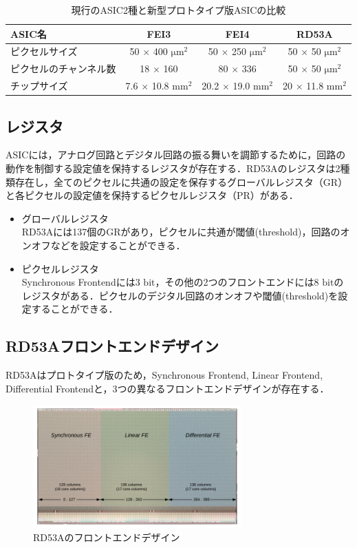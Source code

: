 \begin{table}[h]
  \centering
  \caption{現行のASIC2種と新型プロトタイプ版ASICの比較}
  \begin{tabular} {|l|cc|c|} \hline
    ASIC名 & FEI3 & FEI4 & RD53A \\ \hline \hline
    ピクセルサイズ & 50 $\times$ 400 $\mathrm{\mu m^2}$ & 50 $\times$ 250 $\mathrm{\mu m^2}$ & 50 $\times$ 50 $\mathrm{\mu m^2}$ \\
    ピクセルのチャンネル数 & 18 $\times$ 160 & 80 $\times$ 336 & 50 $\times$ 50 $\mathrm{\mu m^2}$ \\ 
    チップサイズ & 7.6 $\times$ 10.8 $\mathrm{mm^2}$ & 20.2 $\times$ 19.0 $\mathrm{mm^2}$ & 20 $\times$ 11.8 $\mathrm{mm^2}$\\ \hline
  \end{tabular}
  \label{tab:ASIC}
\end{table}


\subsection{レジスタ}
ASICには，アナログ回路とデジタル回路の振る舞いを調節するために，回路の動作を制御する設定値を保持するレジスタが存在する．RD53Aのレジスタは2種類存在し，全てのピクセルに共通の設定を保存するグローバルレジスタ（GR）と各ピクセルの設定値を保持するピクセルレジスタ（PR）がある．
\begin{itemize}
\item グローバルレジスタ\\
  RD53Aには137個のGRがあり，ピクセルに共通が閾値(threshold)，回路のオンオフなどを設定することができる．
\item ピクセルレジスタ\\
  Synchronous Frontendには3 $\mathrm{bit}$，その他の2つのフロントエンドには8 $\mathrm{bit}$のレジスタがある．ピクセルのデジタル回路のオンオフや閾値(threshold)を設定することができる．
\end{itemize}


\subsection{RD53Aフロントエンドデザイン}
RD53Aはプロトタイプ版のため，Synchronous Frontend, Linear Frontend, Differential Frontendと，3つの異なるフロントエンドデザインが存在する．

\begin{figure}[h]
\centering
\includegraphics[width=8cm]{./figure/RD53A_FE.png}
\caption{RD53Aのフロントエンドデザイン}
\label{fig:RD53AFE}
\end{figure}

